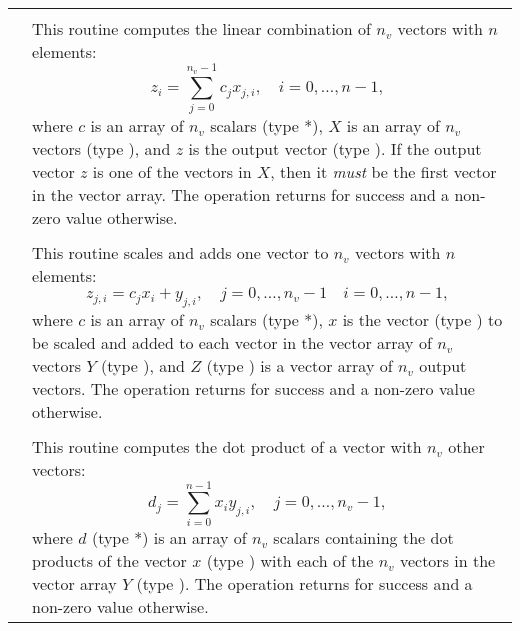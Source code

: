 \label{t:nvecfusedops}
\tablelasttail{\hline}
\begin{xtabular}{|p{\coloneb}|p{\coltwob}|}
 &  \\ 
& This routine computes the linear combination of $n_v$ vectors with $n$
elements:
\begin{equation*}
z_i = \sum_{j=0}^{n_v-1} c_j x_{j,i}, \quad i=0,\ldots,n-1,
\end{equation*}
where $c$ is an array of $n_v$ scalars (type *), $X$ is an array of
$n_v$ vectors (type ), and $z$ is the output vector (type
). If the output vector $z$ is one of the vectors in $X$, then it
\textit{must} be the first vector in the vector array. The operation returns
 for success and a non-zero value otherwise.
\\[2mm]
 &  \\ 
& This routine scales and adds one vector to $n_v$ vectors with $n$ elements:
\begin{equation*}
z_{j,i} = c_j x_i + y_{j,i}, \quad j=0,\ldots,n_v-1 \quad i=0,\ldots,n-1,
\end{equation*}
where $c$ is an array of $n_v$ scalars (type *), $x$ is the vector
(type ) to be scaled and added to each vector in the vector array
of $n_v$ vectors $Y$ (type ), and $Z$ (type ) is a
vector array of $n_v$ output vectors. The operation returns  for success and a
non-zero value otherwise.
\\[2mm]
 &  \\ 
& This routine computes the dot product of a vector with $n_v$ other vectors:
\begin{equation*}
d_j = \sum_{i=0}^{n-1} x_i y_{j,i}, \quad j=0,\ldots,n_v-1,
\end{equation*}
where $d$ (type *) is an array of $n_v$ scalars containing the
dot products of the vector $x$ (type ) with each of the $n_v$
vectors in the vector array $Y$ (type ). The operation returns
 for success and a non-zero value otherwise.
\\
\end{xtabular}
\bigskip

